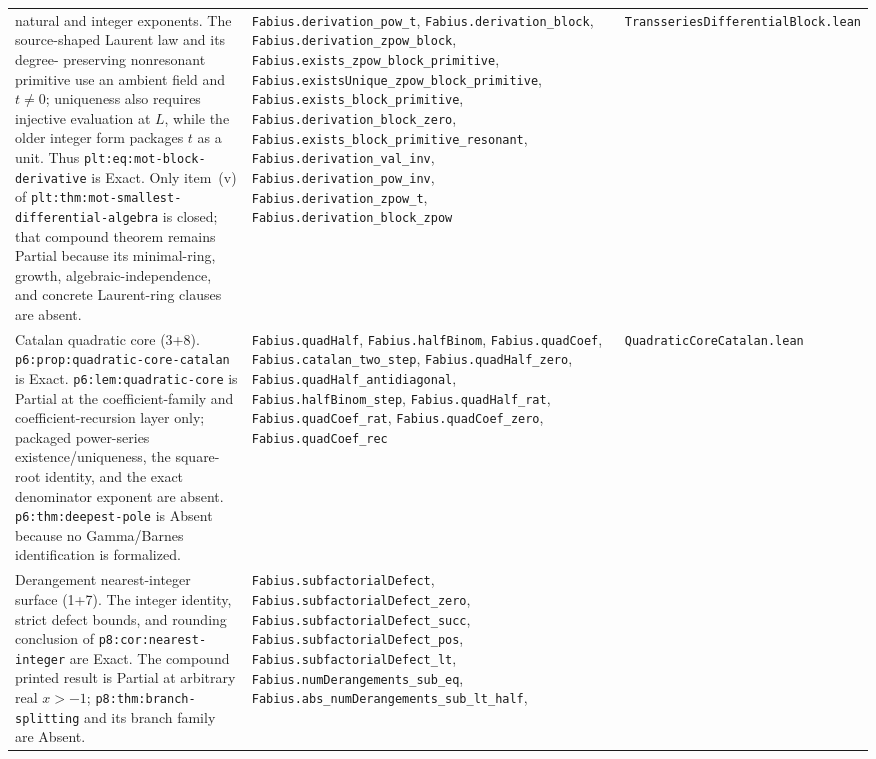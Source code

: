 \documentclass[11pt,oneside]{article}
\theoremstyle{definition}
\theoremstyle{remark}
\begin{document}
\begin{longtable}{@{}p{}p{}p{}@{}}
natural and integer exponents.  The source-shaped Laurent law and its degree-
preserving nonresonant primitive use an ambient field and \(t\ne0\);
uniqueness also requires injective evaluation at \(L\), while the older
integer form packages \(t\) as a unit.  Thus
\nolinkurl{plt:eq:mot-block-derivative} is Exact.  Only item~(v) of
\nolinkurl{plt:thm:mot-smallest-differential-algebra} is closed; that compound
theorem remains Partial because its minimal-ring, growth,
algebraic-independence, and concrete Laurent-ring clauses are absent. &
\nolinkurl{Fabius.derivation_pow_t},
\nolinkurl{Fabius.derivation_block},
\nolinkurl{Fabius.derivation_zpow_block},
\nolinkurl{Fabius.exists_zpow_block_primitive},
\nolinkurl{Fabius.existsUnique_zpow_block_primitive},
\nolinkurl{Fabius.exists_block_primitive},
\nolinkurl{Fabius.derivation_block_zero},
\nolinkurl{Fabius.exists_block_primitive_resonant},
\nolinkurl{Fabius.derivation_val_inv},
\nolinkurl{Fabius.derivation_pow_inv},
\nolinkurl{Fabius.derivation_zpow_t},
\nolinkurl{Fabius.derivation_block_zpow} &
\nolinkurl{TransseriesDifferentialBlock.lean} \\
Catalan quadratic core (3+8).  \nolinkurl{p6:prop:quadratic-core-catalan} is
Exact.  \nolinkurl{p6:lem:quadratic-core} is Partial at the coefficient-family
and coefficient-recursion layer only; packaged power-series
existence/uniqueness, the square-root identity, and the exact denominator
exponent are absent.  \nolinkurl{p6:thm:deepest-pole} is Absent because no
Gamma/Barnes identification is formalized. &
\nolinkurl{Fabius.quadHalf}, \nolinkurl{Fabius.halfBinom},
\nolinkurl{Fabius.quadCoef}, \nolinkurl{Fabius.catalan_two_step},
\nolinkurl{Fabius.quadHalf_zero},
\nolinkurl{Fabius.quadHalf_antidiagonal},
\nolinkurl{Fabius.halfBinom_step}, \nolinkurl{Fabius.quadHalf_rat},
\nolinkurl{Fabius.quadCoef_rat}, \nolinkurl{Fabius.quadCoef_zero},
\nolinkurl{Fabius.quadCoef_rec} &
\nolinkurl{QuadraticCoreCatalan.lean} \\
Derangement nearest-integer surface (1+7).  The integer identity, strict
defect bounds, and rounding conclusion of
\nolinkurl{p8:cor:nearest-integer} are Exact.  The compound printed result is
Partial at arbitrary real \(x>-1\); \nolinkurl{p8:thm:branch-splitting} and
its branch family are Absent. &
\nolinkurl{Fabius.subfactorialDefect},
\nolinkurl{Fabius.subfactorialDefect_zero},
\nolinkurl{Fabius.subfactorialDefect_succ},
\nolinkurl{Fabius.subfactorialDefect_pos},
\nolinkurl{Fabius.subfactorialDefect_lt},
\nolinkurl{Fabius.numDerangements_sub_eq},
\nolinkurl{Fabius.abs_numDerangements_sub_lt_half},

\end{longtable}
\end{document}
